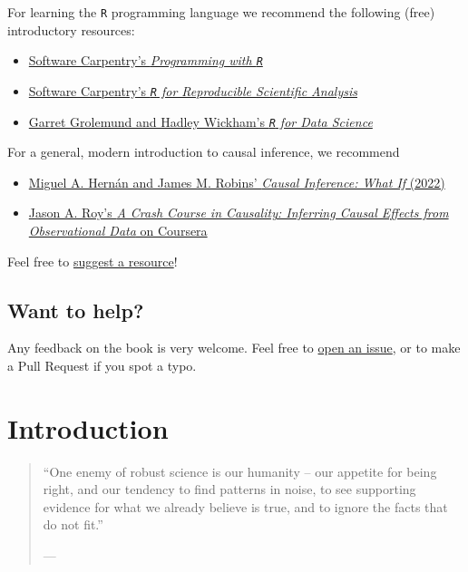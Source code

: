 \documentclass[
  12pt, krantz2,
]{krantz}
\newcommand{\passthrough}[1]{#1}
\providecommand{\tightlist}{%
  \setlength{\itemsep}{0pt}\setlength{\parskip}{0pt}}
\newcommand{\1}{\mathbbm{1}}
\theoremstyle{definition}
\theoremstyle{definition}
\theoremstyle{definition}
\theoremstyle{definition}
\theoremstyle{remark}
\begin{document}
For learning the \passthrough{\lstinline!R!} programming language we recommend the following (free)
introductory resources:

\begin{itemize}
\tightlist
\item
  \href{http://swcarpentry.github.io/r-novice-inflammation/}{Software Carpentry's \emph{Programming with
  \passthrough{\lstinline!R!}}}
\item
  \href{http://swcarpentry.github.io/r-novice-gapminder/}{Software Carpentry's \emph{\passthrough{\lstinline!R!} for Reproducible Scientific
  Analysis}}
\item
  \href{https://r4ds.had.co.nz}{Garret Grolemund and Hadley Wickham's \emph{\passthrough{\lstinline!R!} for Data
  Science}}
\end{itemize}

For a general, modern introduction to causal inference, we recommend

\begin{itemize}
\tightlist
\item
  \href{https://www.hsph.harvard.edu/miguel-hernan/causal-inference-book/}{Miguel A. Hernán and James M. Robins' \emph{Causal Inference: What If}
  (2022)}
\item
  \href{https://www.coursera.org/learn/crash-course-in-causality}{Jason A. Roy's \emph{A Crash Course in Causality: Inferring Causal Effects from
  Observational Data} on
  Coursera}
\end{itemize}

Feel free to \href{https://github.com/tlverse/tlverse-handbook/issues}{suggest a
resource}!

\hypertarget{want-to-help}{%
\section*{Want to help?}\label{want-to-help}}


Any feedback on the book is very welcome. Feel free to \href{https://github.com/tlverse/tlverse-handbook/issues}{open an
issue}, or to make a Pull
Request if you spot a typo.

\hypertarget{introduction}{%
\chapter*{Introduction}\label{introduction}}


\begin{quote}
``One enemy of robust science is our humanity -- our appetite for
being right, and our tendency to find patterns in noise, to see supporting
evidence for what we already believe is true, and to ignore the facts that do
not fit.''

--- \citet{naturenews_2015}
\end{quote}
\end{document}
